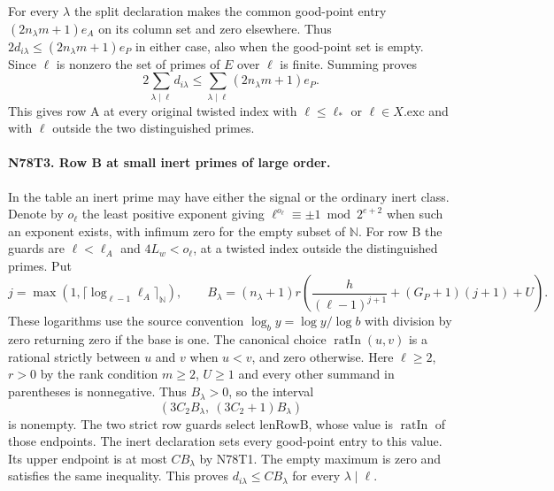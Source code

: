 For every $\lambda$ the split declaration makes the common good-point
entry $(2n_\lambda m+1)e_A$ on its column set and zero elsewhere.
Thus $2d_{i\lambda}\le(2n_\lambda m+1)e_P$ in either case, also
when the good-point set is empty. Since $\ell$ is nonzero the set
of primes of $E$ over $\ell$ is finite. Summing proves
\[
       2\sum_{\lambda\mid\ell}d_{i\lambda}
          \le \sum_{\lambda\mid\ell}(2n_\lambda m+1)e_P .
\]
This gives row A at every original twisted index with
$\ell\le\ell_*$ or $\ell\in X.\mathrm{exc}$ and with $\ell$ outside
the two distinguished primes.

\paragraph{N78T3. Row B at small inert primes of large order.}
In the table an inert prime may have either the signal or the ordinary
inert class. Denote by $o_\ell$ the least positive exponent giving
$\ell^{o_\ell}\equiv\pm1\bmod 2^{e+2}$ when such an exponent exists,
with infimum zero for the empty subset of $\mathbb N$.
For row B the guards are $\ell<\ell_A$ and $4L_w<o_\ell$, at a
twisted index outside the distinguished primes. Put
\[
 j=\max(1,\lceil\log_{\ell-1}\ell_A\rceil_{\mathbb N}),\qquad
 B_\lambda=(n_\lambda+1)r
 \left(\frac{h}{(\ell-1)^{j+1}}+(G_P+1)(j+1)+U\right).
\]
These logarithms use the source convention
$\log_b y=\log y/\log b$ with division by zero returning zero
if the base is one. The canonical choice $\operatorname{ratIn}(u,v)$
is a rational strictly between $u$ and $v$ when $u<v$, and zero
otherwise. Here $\ell\ge2$, $r>0$ by the rank condition $m\ge2$,
$U\ge1$ and every other summand in parentheses is nonnegative.
Thus $B_\lambda>0$, so the interval
\[
      \left(3C_2 B_\lambda,\ (3C_2+1)B_\lambda\right)
\]
is nonempty. The two strict row guards select
$\mathrm{lenRowB}$, whose value is $\operatorname{ratIn}$ of those
endpoints. The inert declaration sets every good-point entry to this
value. Its upper endpoint is at most $CB_\lambda$ by N78T1.
The empty maximum is zero and satisfies the same inequality.
This proves $d_{i\lambda}\le CB_\lambda$ for every $\lambda\mid\ell$.

